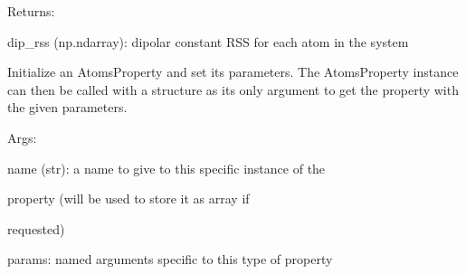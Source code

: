 \documentclass[letterpaper,10pt,english]{sphinxmanual}
\begin{document}
\begin{fulllineitems}
\begin{DUlineblock}{0em}
\item[] Returns:
\item[]
\begin{DUlineblock}{\DUlineblockindent}
\item[] dip\_rss (np.ndarray): dipolar constant RSS for each atom in the system
\end{DUlineblock}
\end{DUlineblock}

Initialize an AtomsProperty and set its parameters.
The AtomsProperty instance can then be called with a structure as its
only argument to get the property with the given parameters.

\begin{DUlineblock}{0em}
\item[] Args:
\item[]
\begin{DUlineblock}{\DUlineblockindent}
\item[] name (str): a name to give to this specific instance of the
\item[]
\begin{DUlineblock}{\DUlineblockindent}
\item[] property (will be used to store it as array if
\item[] requested)
\end{DUlineblock}
\item[] params: named arguments specific to this type of property
\end{DUlineblock}
\end{DUlineblock}

\begin{fulllineitems}
\label{doctree/soprano.properties.nmr.dipolar:soprano.properties.nmr.dipolar.DipolarRSS.default_name}
\end{fulllineitems}


\begin{fulllineitems}
\label{doctree/soprano.properties.nmr.dipolar:soprano.properties.nmr.dipolar.DipolarRSS.default_params}
\end{fulllineitems}


\begin{fulllineitems}
\label{doctree/soprano.properties.nmr.dipolar:soprano.properties.nmr.dipolar.DipolarRSS.extract}
\end{fulllineitems}


\end{fulllineitems}
\end{document}
